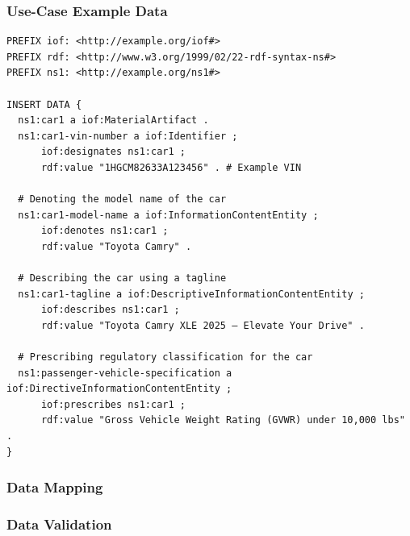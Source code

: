 \subsubsection*{Use-Case Example Data}

\begin{verbatim}
PREFIX iof: <http://example.org/iof#>
PREFIX rdf: <http://www.w3.org/1999/02/22-rdf-syntax-ns#>
PREFIX ns1: <http://example.org/ns1#>

INSERT DATA {
  ns1:car1 a iof:MaterialArtifact .
  ns1:car1-vin-number a iof:Identifier ;
      iof:designates ns1:car1 ;
      rdf:value "1HGCM82633A123456" . # Example VIN

  # Denoting the model name of the car
  ns1:car1-model-name a iof:InformationContentEntity ;
      iof:denotes ns1:car1 ;
      rdf:value "Toyota Camry" .

  # Describing the car using a tagline
  ns1:car1-tagline a iof:DescriptiveInformationContentEntity ;
      iof:describes ns1:car1 ;
      rdf:value "Toyota Camry XLE 2025 – Elevate Your Drive" .

  # Prescribing regulatory classification for the car
  ns1:passenger-vehicle-specification a iof:DirectiveInformationContentEntity ;
      iof:prescribes ns1:car1 ;
      rdf:value "Gross Vehicle Weight Rating (GVWR) under 10,000 lbs" .
}    
\end{verbatim}


\subsubsection*{Data Mapping}


\subsubsection*{Data Validation}
